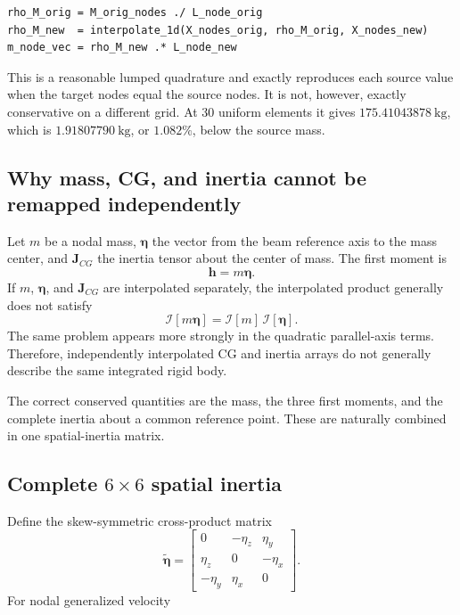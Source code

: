 \documentclass[11pt,a4paper]{article}
\newcommand{\mat}[1]{\bm{#1}}
\newcommand{\vect}[1]{\bm{#1}}
\begin{document}
\begin{lstlisting}[caption={Original density-interpolation pattern.}]
rho_M_orig = M_orig_nodes ./ L_node_orig
rho_M_new  = interpolate_1d(X_nodes_orig, rho_M_orig, X_nodes_new)
m_node_vec = rho_M_new .* L_node_new
\end{lstlisting}

This is a reasonable lumped quadrature and exactly reproduces each source
value when the target nodes equal the source nodes.  It is not, however,
exactly conservative on a different grid.  At 30 uniform elements it gives
\(175.41043878\ \mathrm{kg}\), which is \(1.91807790\ \mathrm{kg}\), or
\(1.082\%\), below the source mass.

\subsection{Why mass, CG, and inertia cannot be remapped independently}

Let \(m\) be a nodal mass, \(\vect\eta\) the vector from the beam reference
axis to the mass center, and \(\mat J_{CG}\) the inertia tensor about the
center of mass.  The first moment is
\begin{equation}
\vect h = m\vect\eta.
\end{equation}
If \(m\), \(\vect\eta\), and \(\mat J_{CG}\) are interpolated separately, the
interpolated product generally does not satisfy
\begin{equation}
\mathcal I[m\vect\eta]
= \mathcal I[m]\,\mathcal I[\vect\eta].
\end{equation}
The same problem appears more strongly in the quadratic parallel-axis terms.
Therefore, independently interpolated CG and inertia arrays do not generally
describe the same integrated rigid body.

The correct conserved quantities are the mass, the three first moments, and
the complete inertia about a common reference point.  These are naturally
combined in one spatial-inertia matrix.

\subsection{Complete \(6\times6\) spatial inertia}

Define the skew-symmetric cross-product matrix
\begin{equation}
\widetilde{\vect\eta}=
\begin{bmatrix}
0 & -\eta_z & \eta_y\\
\eta_z & 0 & -\eta_x\\
-\eta_y & \eta_x & 0
\end{bmatrix}.
\end{equation}
For nodal generalized velocity
\end{document}

